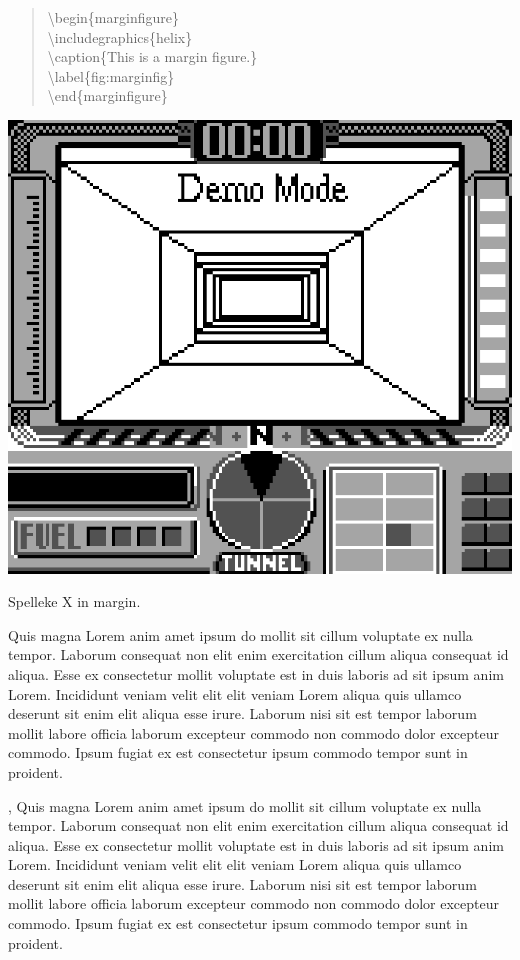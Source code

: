 \documentclass[
  english,
  symmetric,justified,marginals=raggedouter]{tufte-book}
\newenvironment{docspec}{\begin{quotation}\ttfamily\parskip0pt\parindent0pt\ignorespaces}{\end{quotation}}%
\begin{document}
\begin{docspec}
\textbackslash begin\{marginfigure\}\\
  \qquad\textbackslash includegraphics\{helix\}\\
  \qquad\textbackslash caption\{This is a margin figure.\}\\
  \qquad\textbackslash label\{fig:marginfig\}\\
\textbackslash end\{marginfigure\}\\
\end{docspec}

\begin{marginfigure}%
  \includegraphics[width=\linewidth]{x.png}
  \caption{Spelleke X in margin.}
  \label{fig:marginfig}
\end{marginfigure}

Quis magna Lorem anim amet ipsum do mollit sit cillum voluptate ex nulla
tempor. Laborum consequat non elit enim exercitation cillum aliqua
consequat id aliqua. Esse ex consectetur mollit voluptate est in duis
laboris ad sit ipsum anim Lorem. Incididunt veniam velit elit elit
veniam Lorem aliqua quis ullamco deserunt sit enim elit aliqua esse
irure. Laborum nisi sit est tempor laborum mollit labore officia laborum
excepteur commodo non commodo dolor excepteur commodo. Ipsum fugiat ex
est consectetur ipsum commodo tempor sunt in proident.

, Quis magna Lorem anim amet ipsum do
mollit sit cillum voluptate ex nulla tempor. Laborum consequat non elit
enim exercitation cillum aliqua consequat id aliqua. Esse ex consectetur
mollit voluptate est in duis laboris ad sit ipsum anim Lorem. Incididunt
veniam velit elit elit veniam Lorem aliqua quis ullamco deserunt sit
enim elit aliqua esse irure. Laborum nisi sit est tempor laborum mollit
labore officia laborum excepteur commodo non commodo dolor excepteur
commodo. Ipsum fugiat ex est consectetur ipsum commodo tempor sunt in
proident.
\end{document}
